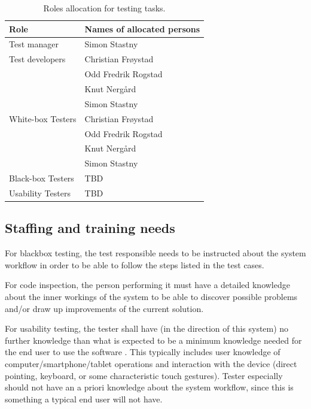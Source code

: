 \documentclass[11pt]{book}
\begin{document}
\begin{table}[H]
	\centering
	\begin{tabular}{| l | l |}
		\hline
		Role 				& Names of allocated persons 	\\ \hline

		Test manager 		& Simon Stastny 				\\ \hline

		Test developers 	& Christian Frøystad 			\\
							& Odd Fredrik Rogstad 			\\
							& Knut Nergård 					\\
							& Simon Stastny 				\\ \hline

		White-box Testers 	& Christian Frøystad 			\\
							& Odd Fredrik Rogstad 			\\
							& Knut Nergård 					\\
							& Simon Stastny 				\\ \hline

		Black-box Testers 	& TBD 							\\ \hline %

		Usability Testers 	& TBD 							\\ \hline %
	\end{tabular}
	\label{tab:test_plan_roles_allocation}
	\caption{Roles allocation for testing tasks.}
\end{table}

\subsection{Staffing and training needs}
For blackbox testing, the test responsible needs to be instructed about the system workflow in order to be able to follow the steps listed in the test cases.

For code inspection, the person performing it must have a detailed knowledge about the inner workings of the system to be able to discover possible problems and/or draw up improvements of the current solution.

For usability testing, the tester shall have (in the direction of this system) no further knowledge than what is expected to be a minimum knowledge needed for the end user to use the software . This typically includes user knowledge of computer/smartphone/tablet operations and interaction with the device (direct pointing, keyboard, or some characteristic touch gestures). Tester especially should not have an a priori knowledge about the system workflow, since this is something a typical end user will not have.
\end{document}
